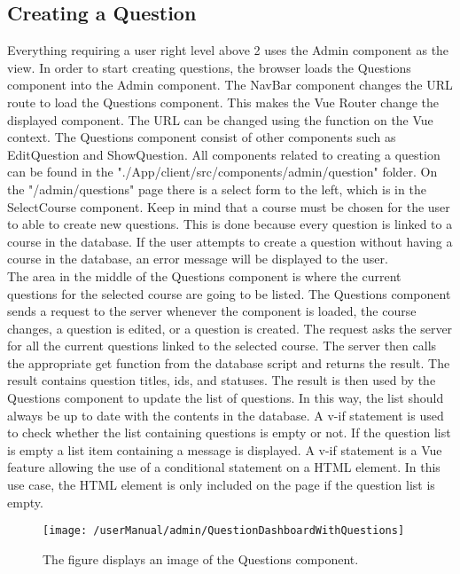 \subsection{Creating a Question}
Everything requiring a user right level above 2 uses the Admin component as the view.  In order to start creating questions, the browser loads the Questions component into the Admin component. 
The NavBar component changes the URL route to load the Questions component. This makes the Vue Router change the displayed component. The URL can be changed using the  function on the Vue context. The Questions component consist of other components such as EditQuestion and ShowQuestion. All components related to creating a question can be found in the "./App/client/src/components/admin/question" folder. On the "/admin/questions" page there is a select form to the left, which is in the SelectCourse component. Keep in mind that a course must be chosen for the user to able to create new questions. This is done because every question is linked to a course in the database.  If the user attempts to create a question without having a course in the database, an error message will be displayed to the user.
\\[11pt]
The area in the middle of the Questions component is where the current questions for the selected course are going to be listed. The Questions component sends a request to the server whenever the component is loaded, the course changes, a question is edited, or a question is created. The request asks the server for all the current questions linked to the selected course. The server then calls the appropriate get function from the database script and returns the result. The result contains question titles, ids, and statuses. The result is then used by the Questions component to update the list of questions. In this way, the list should always be up to date with the contents in the database. A v-if statement is used to check whether the list containing questions is empty or not. If the question list is empty a list item containing a message is displayed. A v-if statement is a Vue feature allowing the use of a conditional statement on a HTML element. In this use case, the HTML element is only included on the page if the question list is empty.
\begin{figure}[H]
    \centering
    \texttt{[image: /userManual/admin/QuestionDashboardWithQuestions]}
    \caption{The figure displays an image of the Questions component.}
    \label{fig:questionVue}
\end{figure}

